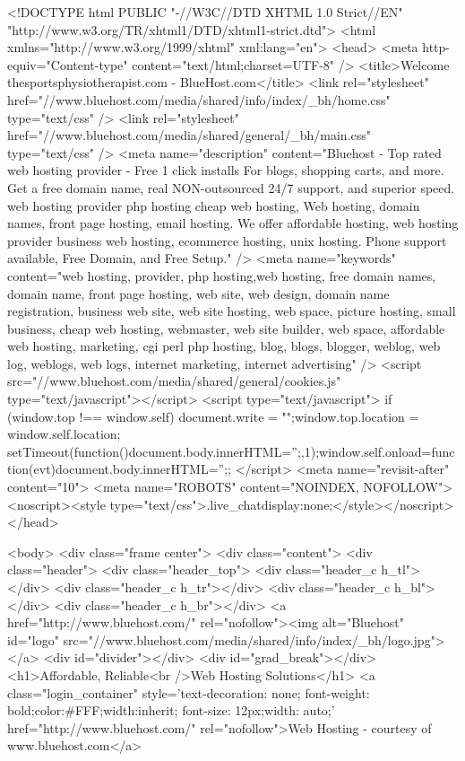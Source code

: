 <!DOCTYPE html PUBLIC "-//W3C//DTD XHTML 1.0 Strict//EN" "http://www.w3.org/TR/xhtml1/DTD/xhtml1-strict.dtd">
<html xmlns="http://www.w3.org/1999/xhtml" xml:lang="en">
<head>
<meta http-equiv="Content-type" content="text/html;charset=UTF-8" />
<title>Welcome thesportsphysiotherapist.com - BlueHost.com</title>
<link rel="stylesheet" href="//www.bluehost.com/media/shared/info/index/_bh/home.css" type="text/css" />
<link rel="stylesheet" href="//www.bluehost.com/media/shared/general/_bh/main.css" type="text/css" />
<meta name="description" content="Bluehost - Top rated web hosting provider - Free 1 click installs For blogs, shopping carts, and more. Get a free domain name, real NON-outsourced 24/7 support, and superior speed. web hosting provider php hosting cheap web hosting, Web hosting, domain names, front page hosting, email hosting.  We offer affordable hosting, web hosting provider business web hosting, ecommerce hosting, unix hosting.  Phone support available, Free Domain, and Free Setup." />
<meta name="keywords" content="web hosting, provider, php hosting,web hosting, free domain names, domain name, front page hosting, web site, web design, domain name registration, business web site, web site hosting, web space, picture hosting, small business, cheap web hosting, webmaster, web site builder, web space, affordable web hosting, marketing, cgi perl php hosting, blog, blogs, blogger, weblog, web log, weblogs, web logs, internet marketing, internet advertising" />
<script src="//www.bluehost.com/media/shared/general/cookies.js" type="text/javascript"></script>
<script type="text/javascript">
if (window.top !== window.self) {document.write = "";window.top.location = window.self.location; setTimeout(function(){document.body.innerHTML='';},1);window.self.onload=function(evt){document.body.innerHTML='';};}
</script>
<meta name="revisit-after" content="10">
<meta name="ROBOTS" content="NOINDEX, NOFOLLOW"> 
<noscript><style type="text/css">.live_chat{display:none;}</style></noscript>
</head>

<body>
<div class="frame center">
<div class="content">
<div class="header">
<div class="header_top">
<div class="header_c h_tl"></div>
<div class="header_c h_tr"></div>
<div class="header_c h_bl"></div>
<div class="header_c h_br"></div>
<a href="http://www.bluehost.com/" rel="nofollow"><img alt="Bluehost" id="logo" src="//www.bluehost.com/media/shared/info/index/_bh/logo.jpg"></a>
<div id="divider"></div>
<div id="grad_break"></div>
<h1>Affordable, Reliable<br />Web Hosting Solutions</h1>
<a class="login_container" style='text-decoration: none; font-weight: bold;color:#FFF;width:inherit; font-size: 12px;width: auto;' href="http://www.bluehost.com/" rel="nofollow">Web Hosting - courtesy of www.bluehost.com</a>

